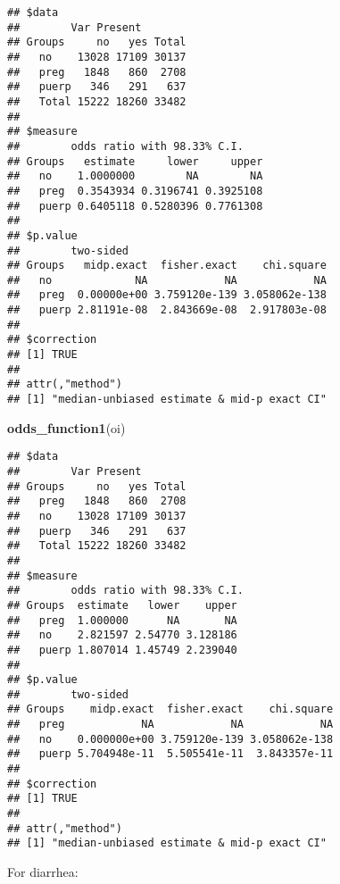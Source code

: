 \documentclass[
]{article}
\newenvironment{Shaded}{\begin{snugshade}}{\end{snugshade}}
\newcommand{\DataTypeTok}[1]{\textcolor[rgb]{0.13,0.29,0.53}{#1}}
\newcommand{\KeywordTok}[1]{\textcolor[rgb]{0.13,0.29,0.53}{\textbf{#1}}}
\newcommand{\NormalTok}[1]{#1}
\newcommand{\OperatorTok}[1]{\textcolor[rgb]{0.81,0.36,0.00}{\textbf{#1}}}
\newcommand{\OtherTok}[1]{\textcolor[rgb]{0.56,0.35,0.01}{#1}}
\newcommand{\StringTok}[1]{\textcolor[rgb]{0.31,0.60,0.02}{#1}}
\begin{document}
\begin{verbatim}
## $data
##        Var Present
## Groups     no   yes Total
##   no    13028 17109 30137
##   preg   1848   860  2708
##   puerp   346   291   637
##   Total 15222 18260 33482
## 
## $measure
##        odds ratio with 98.33% C.I.
## Groups   estimate     lower     upper
##   no    1.0000000        NA        NA
##   preg  0.3543934 0.3196741 0.3925108
##   puerp 0.6405118 0.5280396 0.7761308
## 
## $p.value
##        two-sided
## Groups   midp.exact  fisher.exact    chi.square
##   no             NA            NA            NA
##   preg  0.00000e+00 3.759120e-139 3.058062e-138
##   puerp 2.81191e-08  2.843669e-08  2.917803e-08
## 
## $correction
## [1] TRUE
## 
## attr(,"method")
## [1] "median-unbiased estimate & mid-p exact CI"
\end{verbatim}

\begin{Shaded}
\begin{Highlighting}[]
\KeywordTok{odds_function1}\NormalTok{(oi)}
\end{Highlighting}
\end{Shaded}

\begin{verbatim}
## $data
##        Var Present
## Groups     no   yes Total
##   preg   1848   860  2708
##   no    13028 17109 30137
##   puerp   346   291   637
##   Total 15222 18260 33482
## 
## $measure
##        odds ratio with 98.33% C.I.
## Groups  estimate   lower    upper
##   preg  1.000000      NA       NA
##   no    2.821597 2.54770 3.128186
##   puerp 1.807014 1.45749 2.239040
## 
## $p.value
##        two-sided
## Groups    midp.exact  fisher.exact    chi.square
##   preg            NA            NA            NA
##   no    0.000000e+00 3.759120e-139 3.058062e-138
##   puerp 5.704948e-11  5.505541e-11  3.843357e-11
## 
## $correction
## [1] TRUE
## 
## attr(,"method")
## [1] "median-unbiased estimate & mid-p exact CI"
\end{verbatim}

For diarrhea:

\begin{Shaded}
\end{Shaded}
\end{document}
